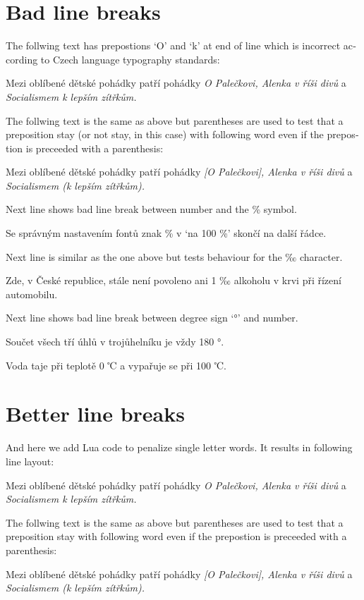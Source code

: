 \documentclass{article}
\newcommand{\expl}[1]{\begin{english}\sffamily #1\end{english}}
\begin{document}
\section{Bad line breaks}
\expl{The follwing text has prepostions `O' and `k' at end of line which
  is incorrect according to Czech language typography standards:}

Mezi oblíbené dětské pohádky patří pohádky \emph{O Palečkovi, Alenka v říši
  divů} a \emph{Socialismem k lepším zítřkům.}

\expl{The follwing text is the same as above but parentheses are used to test
  that a preposition stay (or not stay, in this case) with following word
  even if the prepostion is preceeded with a parenthesis:}

Mezi oblíbené dětské pohádky patří pohádky \emph{[O Palečkovi], Alenka v říši
  divů} a \emph{Socialismem (k lepším zítřkům).}

\expl{Next line shows bad line break between number and the \% symbol.}

Se správným nastavením fontů znak \% v `na 100 \%' skončí na další řádce.

\expl{Next line is similar as the one above but tests behaviour for the ‰
  character.}

Zde, v České republice, stále není povoleno ani 1 ‰ alkoholu v krvi při
řízení automobilu.

\expl{Next line shows bad line break between degree sign `°' and number.}

Součet všech tří úhlů v trojůhelníku je vždy 180 °.

Voda taje při teplotě 0 ℃ a vypařuje se při 100 ℃.

\expl{}

\section{Better line breaks}
\expl{And here we add Lua code to penalize single letter words. It results in
following line layout:}

\cstypoSingleLetterEnable{}
\cstypoPercentsEnable{}
\cstypoALetterEnable{}
Mezi oblíbené dětské pohádky patří pohádky \emph{O Palečkovi, Alenka v říši
  divů} a \emph{Socialismem k lepším zítřkům.}

\expl{The follwing text is the same as above but parentheses are used to test
  that a preposition stay with following word even if the prepostion is
  preceeded with a parenthesis:}

Mezi oblíbené dětské pohádky patří pohádky \emph{[O Palečkovi], Alenka v říši
  divů} a \emph{Socialismem (k lepším zítřkům).}
\end{document}
